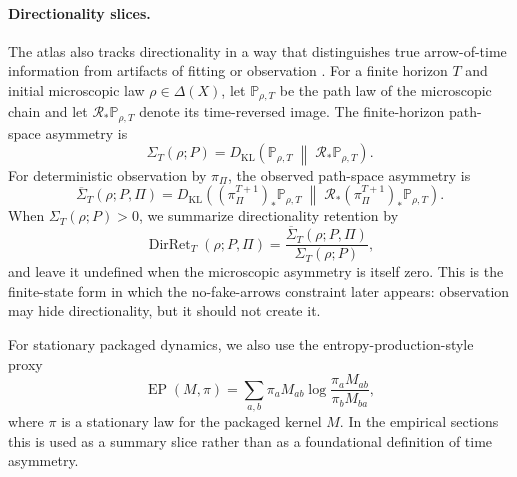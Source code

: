 \documentclass[11pt]{article}
\theoremstyle{definition}
\begin{document}
\paragraph{Directionality slices.}
The atlas also tracks directionality in a way that distinguishes true arrow-of-time information from artifacts of fitting or observation \cite{crooks1999entropy,seifert2012stochastic}. For a finite horizon $T$ and initial microscopic law $\rho\in\Delta(X)$, let $\mathbb{P}_{\rho,T}$ be the path law of the microscopic chain and let $\mathcal{R}_{*}\mathbb{P}_{\rho,T}$ denote its time-reversed image. The finite-horizon path-space asymmetry is
\begin{equation}\label{eq:path_asym}
\Sigma_{T}(\rho;P)
=
D_{\mathrm{KL}}\!\left(
\mathbb{P}_{\rho,T}
\;\middle\|\;
\mathcal{R}_{*}\mathbb{P}_{\rho,T}
\right).
\end{equation}
For deterministic observation by $\pi_{\Pi}$, the observed path-space asymmetry is
\begin{equation}\label{eq:observed_path_asym}
\overline{\Sigma}_{T}(\rho;P,\Pi)
=
D_{\mathrm{KL}}\!\left(
(\pi_{\Pi}^{T+1})_{*}\mathbb{P}_{\rho,T}
\;\middle\|\;
\mathcal{R}_{*}(\pi_{\Pi}^{T+1})_{*}\mathbb{P}_{\rho,T}
\right).
\end{equation}
When $\Sigma_{T}(\rho;P)>0$, we summarize directionality retention by
\begin{equation}\label{eq:directionality_retention}
\operatorname{DirRet}_{T}(\rho;P,\Pi)
=
\frac{
\overline{\Sigma}_{T}(\rho;P,\Pi)
}{
\Sigma_{T}(\rho;P)
},
\end{equation}
and leave it undefined when the microscopic asymmetry is itself zero. This is the finite-state form in which the no-fake-arrows constraint later appears: observation may hide directionality, but it should not create it.

For stationary packaged dynamics, we also use the entropy-production-style proxy
\begin{equation}\label{eq:stationary_ep_proxy}
\operatorname{EP}(M,\pi)
=
\sum_{a,b}
\pi_{a}M_{ab}
\log\frac{\pi_{a}M_{ab}}{\pi_{b}M_{ba}},
\end{equation}
where $\pi$ is a stationary law for the packaged kernel $M$. In the empirical sections this is used as a summary slice rather than as a foundational definition of time asymmetry.
\end{document}
